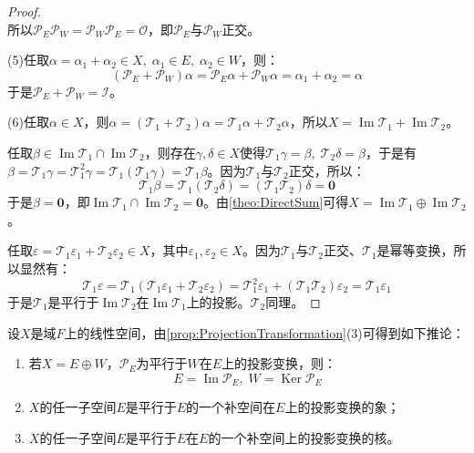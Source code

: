 \begin{proof}
\begin{equation*}
	\end{equation*}
	所以$\mathcal{P}_E\mathcal{P}_W=\mathcal{P}_W\mathcal{P}_E=\mathcal{O}$，即$\mathcal{P}_E$与$\mathcal{P}_W$正交。\par
	(5)任取$\alpha=\alpha_1+\alpha_2\in X,\;\alpha_1\in E,\;\alpha_2\in W$，则：
	\begin{equation*}
		(\mathcal{P}_E+\mathcal{P}_W)\alpha=\mathcal{P}_E\alpha+\mathcal{P}_W\alpha=\alpha_1+\alpha_2=\alpha
	\end{equation*}
	于是$\mathcal{P}_E+\mathcal{P}_W=\mathcal{I}$。\par
	(6)任取$\alpha\in X$，则$\alpha=(\mathcal{T}_1+\mathcal{T}_2)\alpha=\mathcal{T}_1\alpha+\mathcal{T}_2\alpha$，所以$X=\operatorname{Im}\mathcal{T}_1+\operatorname{Im}\mathcal{T}_2$。\par
	任取$\beta\in\operatorname{Im}\mathcal{T}_1\cap\operatorname{Im}\mathcal{T}_2$，则存在$\gamma,\delta\in X$使得$\mathcal{T}_1\gamma=\beta,\;\mathcal{T}_2\delta=\beta$，于是有$\beta=\mathcal{T}_1\gamma=\mathcal{T}_1^2\gamma=\mathcal{T}_1(\mathcal{T}_1\gamma)=\mathcal{T}_1\beta$。因为$\mathcal{T}_1$与$\mathcal{T}_2$正交，所以：
	\begin{equation*}
		\mathcal{T}_1\beta=\mathcal{T}_1(\mathcal{T}_2\delta)=(\mathcal{T}_1\mathcal{T}_2)\delta=\mathbf{0}
	\end{equation*}
	于是$\beta=\mathbf{0}$，即$\operatorname{Im}\mathcal{T}_1\cap\operatorname{Im}\mathcal{T}_2=\mathbf{0}$。由\cref{theo:DirectSum}可得$X=\operatorname{Im}\mathcal{T}_1\oplus\operatorname{Im}\mathcal{T}_2$。\par
	任取$\varepsilon=\mathcal{T}_1\varepsilon_1+\mathcal{T}_2\varepsilon_2\in X$，其中$\varepsilon_1,\varepsilon_2\in X$。因为$\mathcal{T}_1$与$\mathcal{T}_2$正交、$\mathcal{T}_1$是幂等变换，所以显然有：
	\begin{equation*}
		\mathcal{T}_1\varepsilon=\mathcal{T}_1(\mathcal{T}_1\varepsilon_1+\mathcal{T}_2\varepsilon_2)=\mathcal{T}_1^2\varepsilon_1+(\mathcal{T}_1\mathcal{T}_2)\varepsilon_2=\mathcal{T}_1\varepsilon_1
	\end{equation*}
	于是$\mathcal{T}_1$是平行于$\operatorname{Im}\mathcal{T}_2$在$\operatorname{Im}\mathcal{T}_1$上的投影。$\mathcal{T}_2$同理。
\end{proof}
\begin{corollary}
	设$X$是域$F$上的线性空间，由\cref{prop:ProjectionTransformation}(3)可得到如下推论：
	\begin{enumerate}
		\item 若$X=E\oplus W$，$\mathcal{P}_E$为平行于$W$在$E$上的投影变换，则：
		\begin{equation*}
			E=\operatorname{Im}\mathcal{P}_E,\;W=\operatorname{Ker}\mathcal{P}_E
		\end{equation*}
		\item $X$的任一子空间$E$是平行于$E$的一个补空间在$E$上的投影变换的象；
		\item $X$的任一子空间$E$是平行于$E$在$E$的一个补空间上的投影变换的核。
	\end{enumerate}
\end{corollary}
